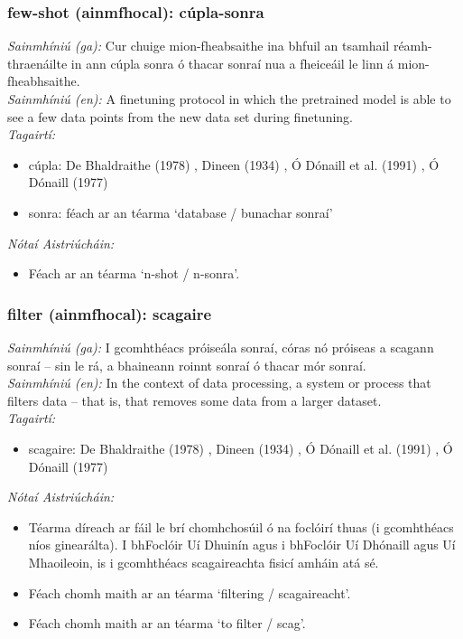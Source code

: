 \subsubsection*{few-shot (ainmfhocal): cúpla-sonra}
 \noindent \textit{Sainmhíniú (ga):} Cur chuige mion-fheabsaithe ina bhfuil an tsamhail réamh-thraenáilte in ann cúpla sonra ó thacar sonraí nua a fheiceáil le linn á mion-fheabhsaithe.
\\
 \noindent \textit{Sainmhíniú (en):} A finetuning protocol in which the pretrained model is able to see a few data points from the new data set during finetuning.
\\
 \noindent \textit{Tagairtí:}
\begin{itemize}
	\item cúpla: De Bhaldraithe (1978) \cite{de-bhaldraithe}, Dineen (1934) \cite{dineen}, Ó Dónaill et al. (1991) \cite{focloir-beag}, Ó Dónaill (1977) \cite{odonaill}
	\item sonra: féach ar an téarma `database / bunachar sonraí'
\end{itemize}

 \noindent \textit{Nótaí Aistriúcháin:}
\begin{itemize}
	\item Féach ar an téarma `n-shot / n-sonra'.
\end{itemize}


\subsubsection*{filter (ainmfhocal): scagaire}
 \noindent \textit{Sainmhíniú (ga):} I gcomhthéacs próiseála sonraí, córas nó próiseas a scagann sonraí -- sin le rá, a bhaineann roinnt sonraí ó thacar mór sonraí.
\\
 \noindent \textit{Sainmhíniú (en):} In the context of data processing, a system or process that filters data -- that is, that removes some data from a larger dataset.
\\
 \noindent \textit{Tagairtí:}
\begin{itemize}
	\item scagaire: De Bhaldraithe (1978) \cite{de-bhaldraithe}, Dineen (1934) \cite{dineen}, Ó Dónaill et al. (1991) \cite{focloir-beag}, Ó Dónaill (1977) \cite{odonaill}
\end{itemize}

 \noindent \textit{Nótaí Aistriúcháin:}
\begin{itemize}
	\item Téarma díreach ar fáil le brí chomhchosúil ó na foclóirí thuas (i gcomhthéacs níos ginearálta). I bhFoclóir Uí Dhuinín agus i bhFoclóir Uí Dhónaill agus Uí Mhaoileoin, is i gcomhthéacs scagaireachta fisicí amháin atá sé.
	\item Féach chomh maith ar an téarma `filtering / scagaireacht'.
	\item Féach chomh maith ar an téarma `to filter / scag'.
\end{itemize}


